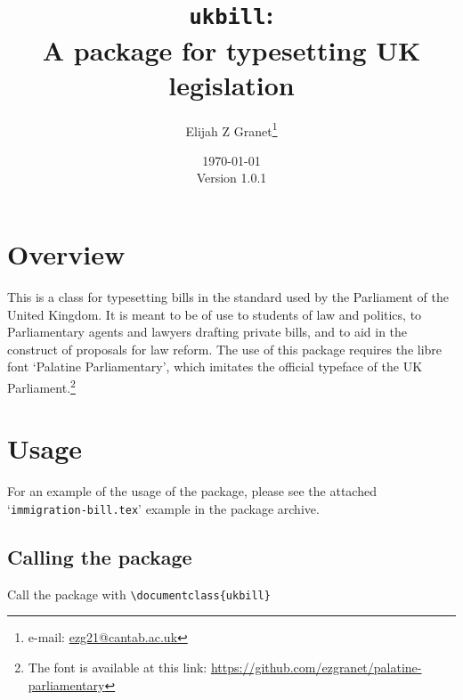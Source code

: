 \documentclass{article}
\date{\today\\\smallskip\ttfamily Version 1.0.1}
\author{Elijah Z Granet\thanks{e-mail: \href{mailto:ezg21@cantab.ac.uk}{\ttfamily ezg21@cantab.ac.uk}}}
\title{\texttt{ukbill}:\\A package for typesetting UK legislation}
\begin{document}
\maketitle
\tableofcontents
\clearpage
\section{Overview}
This is a class for typesetting bills in the standard used by the Parliament of the United Kingdom. It is meant to be of use to students of law and politics, to Parliamentary agents and lawyers drafting private bills, and to aid in the construct of proposals for law reform. The use of this package requires the libre font `Palatine Parliamentary', which imitates the official typeface of the UK Parliament.\footnote{The font is available at this link: \url{https://github.com/ezgranet/palatine-parliamentary}}
\section{Usage}
For an example of the usage of the package, please see the attached `\texttt{immigration-bill.tex}' example in the package archive.

\subsection{Calling the package}
Call the package with {\color{darkspringgreen}\ttfamily \verb|\documentclass{ukbill}|}
\end{document}
